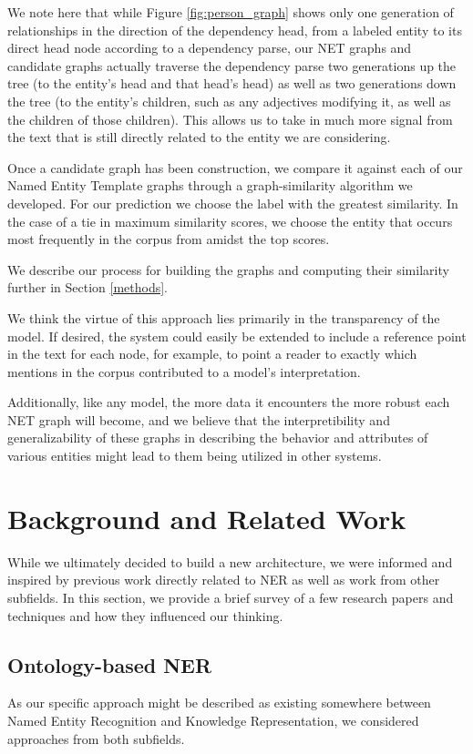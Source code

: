 \documentclass[11pt,a4paper]{article}
\begin{document}
We note here that while Figure \ref{fig:person_graph} shows only one generation of relationships in the direction of the dependency head, from a labeled entity to its direct head node according to a dependency parse, our NET graphs and candidate graphs actually traverse the dependency parse two generations up the tree (to the entity's head and that head's head) as well as two generations down the tree (to the entity's children, such as any adjectives modifying it, as well as the children of those children). This allows us to take in much more signal from the text that is still directly related to the entity we are considering.

Once a candidate graph has been construction, we compare it against each of our Named Entity Template graphs through a graph-similarity algorithm we developed. For our prediction we choose the label with the greatest similarity. In the case of a tie in maximum similarity scores, we choose the entity that occurs most frequently in the corpus from amidst the top scores.

We describe our process for building the graphs and computing their similarity further in Section \ref{methods}.

We think the virtue of this approach lies primarily in the transparency of the model. If desired, the system could easily be extended to include a reference point in the text for each node, for example, to point a reader to exactly which mentions in the corpus contributed to a model's interpretation.

Additionally, like any model, the more data it encounters the more robust each NET graph will become, and we believe that the interpretibility and generalizability of these graphs in describing the behavior and attributes of various entities might lead to them being utilized in other systems.

\section{Background and Related Work} \label{background}

While we ultimately decided to build a new architecture, we were informed and inspired by previous work directly related to NER as well as work from other subfields. In this section, we provide a brief survey of a few research papers and techniques and how they influenced our thinking.

\subsection{Ontology-based NER}
As our specific approach might be described as existing somewhere between Named Entity Recognition and Knowledge Representation, we considered approaches from both subfields.
\end{document}
